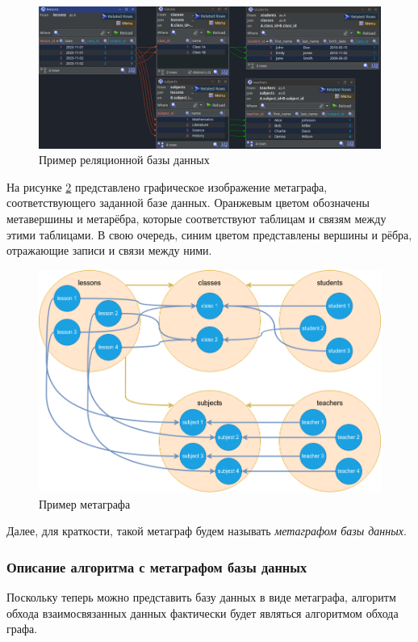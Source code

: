 \begin{figure}
  \includegraphics[scale=0.45]{./img/jailer-example-db-overview.png}
  \caption{Пример реляционной базы данных}
  \label{db-example}
\end{figure}

На рисунке \ref{metagraph-example} представлено графическое изображение метаграфа, соответствующего заданной базе данных. Оранжевым цветом обозначены метавершины и метарёбра, которые соответствуют таблицам и связям между этими таблицами. В свою очередь, синим цветом представлены вершины и рёбра, отражающие записи и связи между ними.

\begin{figure}
  \includegraphics[scale=0.5]{./img/drawio-metagraph-overview.png}
  \caption{Пример метаграфа}
  \label{metagraph-example}
\end{figure}

Далее, для краткости, такой метаграф будем называть \textit{метаграфом базы данных}.

\subsubsection{Описание алгоритма с метаграфом базы данных}
Поскольку теперь можно представить базу данных в виде метаграфа, алгоритм обхода взаимосвязанных данных фактически будет являться алгоритмом обхода графа.


